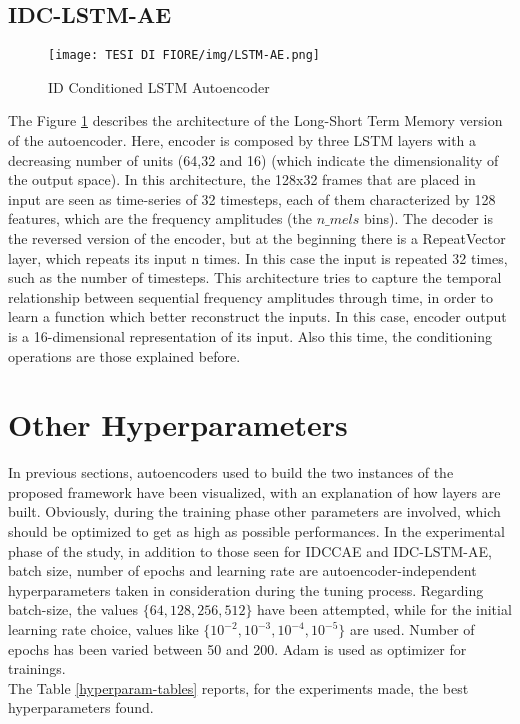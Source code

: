 \subsection{IDC-LSTM-AE}
\begin{figure}[ht]
\texttt{[image: TESI DI FIORE/img/LSTM-AE.png]}
\centering
\caption{ID Conditioned LSTM Autoencoder}
\label{LSTM-AE}
\end{figure}
The Figure \ref{LSTM-AE} describes the architecture of the Long-Short Term Memory version of the autoencoder. Here, encoder is composed by three LSTM layers with a decreasing number of units (64,32 and 16) (which indicate the dimensionality of the output space). In this architecture, the 128x32 frames that are placed in input are seen as time-series of 32 timesteps, each of them characterized by 128 features, which are the frequency amplitudes (the $n\_mels$ bins). The decoder is the reversed version of the encoder, but at the beginning there is a RepeatVector layer, which repeats its input n times. In this case the input is repeated 32 times, such as the number of timesteps. This architecture tries to capture the temporal relationship between sequential frequency amplitudes through time, in order to learn a function which better reconstruct the inputs. In this case, encoder output is a 16-dimensional representation of its input. Also this time, the conditioning operations are those explained before.

\section{Other Hyperparameters}
In previous sections, autoencoders used to build the two instances of the proposed framework have been visualized, with an explanation of how layers are built. Obviously, during the training phase other parameters are involved, which should be optimized to get as high as possible performances. In the experimental phase of the study, in addition to those seen for IDCCAE and IDC-LSTM-AE, batch size, number of epochs and learning rate are autoencoder-independent hyperparameters taken in consideration during the tuning process. Regarding batch-size, the values $\{64,128,256,512\}$ have been attempted, while for the initial learning rate choice, values like $\{10^{-2}, 10^{-3}, 10^{-4}, 10^{-5}\}$ are used. Number of epochs has been varied between 50 and 200. Adam is used as optimizer for trainings.\\
The Table \ref{hyperparam-tables} reports, for the experiments made, the best hyperparameters found.

